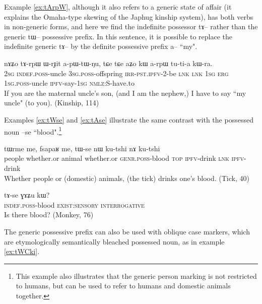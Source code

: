 \documentclass[oldfontcommands,oneside,a4paper,11pt]{article}
\newcommand{\ipa}[1]{{\phon \mbox{#1}}} %
\begin{document}
Example \ref{ex:tArpW}, although it also refers to a generic state of affair (it explains the Omaha-type skewing of the Japhug kinship system), has both verbs in non-generic forms, and here we find the indefinite possessor \ipa{tɤ--} rather than the generic \ipa{tɯ--} possessive prefix. In this sentence, it is possible to replace the indefinite generic \ipa{tɤ--} by the definite possessive prefix \ipa{a--} ``my".

\begin{exe}
\ex  \label{ex:tArpW}
\gll
\ipa{nɤʑo} 	\ipa{tɤ-rpɯ} 	\ipa{ɯ-rɟit} 	\ipa{a-pɯ-tɯ-ŋu,} 	\ipa{tɕe} 	\ipa{tɕe} 	\ipa{aʑo} 	\ipa{kɯ} 	\ipa{a-rpɯ} 	\ipa{tu-ti-a} 	\ipa{kɯ-ra.}  \\
\textsc{2sg} \textsc{indef.poss}-uncle \textsc{3sg.poss}-offspring \textsc{irr-pst.ipfv}-2-be \textsc{lnk} \textsc{lnk} \textsc{1sg} \textsc{erg}  \textsc{1sg.poss}-uncle \textsc{ipfv}-say-\textsc{1sg} \textsc{nmlz:S}-have.to  \\
\glt If you are the maternal uncle's son, (and I am the nephew,) I have to say ``my uncle" (to you).  (Kinship, 114)
\end{exe}

Examples \ref{ex:tWse} and \ref{ex:tAse} illustrate the same contrast with the possessed noun \ipa{--se} ``blood".\footnote{This example also illustrates that the generic person marking is not restricted to humans, but can be used to refer to humans and domestic animals together.  }

\begin{exe}
\ex  \label{ex:tWse}
\gll
\ipa{tɯrme} 	\ipa{me,} 	\ipa{fsapaʁ} 	\ipa{me,} 	\ipa{tɯ-se} 	\ipa{nɯ} 	\ipa{ku-tshi} 	\ipa{nɤ} 	\ipa{ku-tshi} \\
people whether.or animal whether.or \textsc{genr.poss}-blood \textsc{top} \textsc{ipfv}-drink \textsc{lnk} \textsc{ipfv}-drink \\
\glt Whether people or (domestic) animals, (the tick) drinks one's blood. (Tick, 40)
\end{exe}

\begin{exe}
\ex  \label{ex:tAse}
\gll
\ipa{tɤ-se} 	\ipa{ɣɤʑu} 	\ipa{kɯ?} \\
\textsc{indef.poss}-blood \textsc{exist:sensory} \textsc{interrogative} \\
\glt Is there blood? (Monkey, 76)
\end{exe}

The generic possessive prefix can also be used with oblique case markers, which are etymologically semantically bleached possessed noun, as in example \ref{ex:tWCki}.
\end{document}
